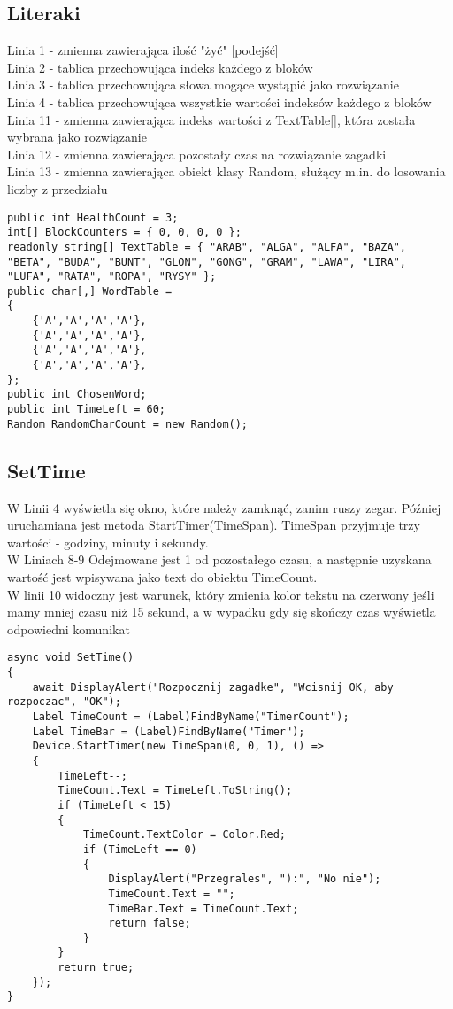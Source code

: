 \subsection{Literaki}
Linia 1 - zmienna zawierająca ilość "żyć" [podejść]
\\Linia 2 - tablica przechowująca indeks każdego z bloków
\\Linia 3 - tablica przechowująca słowa mogące wystąpić jako rozwiązanie
\\Linia 4 - tablica przechowująca wszystkie wartości indeksów każdego z bloków
\\Linia 11 - zmienna zawierająca indeks wartości z TextTable[], która została wybrana jako rozwiązanie
\\Linia 12 - zmienna zawierająca pozostały czas na rozwiązanie zagadki
\\Linia 13 - zmienna zawierająca obiekt klasy Random, służący m.in. do losowania liczby z przedziału
\begin{lstlisting}[caption=Literaki]
public int HealthCount = 3;
int[] BlockCounters = { 0, 0, 0, 0 };
readonly string[] TextTable = { "ARAB", "ALGA", "ALFA", "BAZA", "BETA", "BUDA", "BUNT", "GLON", "GONG", "GRAM", "LAWA", "LIRA", "LUFA", "RATA", "ROPA", "RYSY" };
public char[,] WordTable =
{
	{'A','A','A','A'},
	{'A','A','A','A'},
	{'A','A','A','A'},
	{'A','A','A','A'},
};
public int ChosenWord;
public int TimeLeft = 60;
Random RandomCharCount = new Random();
\end{lstlisting}

\subsection{SetTime}
\hspace{0.60cm}W Linii 4 wyświetla się okno, które należy zamknąć, zanim ruszy zegar. Później uruchamiana jest metoda StartTimer(TimeSpan). TimeSpan przyjmuje trzy wartości - godziny, minuty i sekundy.
\\W Liniach 8-9 Odejmowane jest 1 od pozostałego czasu, a następnie uzyskana wartość jest wpisywana jako text do obiektu TimeCount.
\\W linii 10 widoczny jest warunek, który zmienia kolor tekstu na czerwony jeśli mamy mniej czasu niż 15 sekund, a w wypadku gdy się skończy czas wyświetla odpowiedni komunikat
\begin{lstlisting}[caption=SetTime]
async void SetTime()
{
	await DisplayAlert("Rozpocznij zagadke", "Wcisnij OK, aby rozpoczac", "OK");
	Label TimeCount = (Label)FindByName("TimerCount");
	Label TimeBar = (Label)FindByName("Timer");
	Device.StartTimer(new TimeSpan(0, 0, 1), () =>
	{
		TimeLeft--;
		TimeCount.Text = TimeLeft.ToString();
		if (TimeLeft < 15)
		{
			TimeCount.TextColor = Color.Red;
			if (TimeLeft == 0)
			{
				DisplayAlert("Przegrales", "):", "No nie");
				TimeCount.Text = "";
				TimeBar.Text = TimeCount.Text;
				return false;
			}
		}
		return true;
	});
}

\end{lstlisting}

